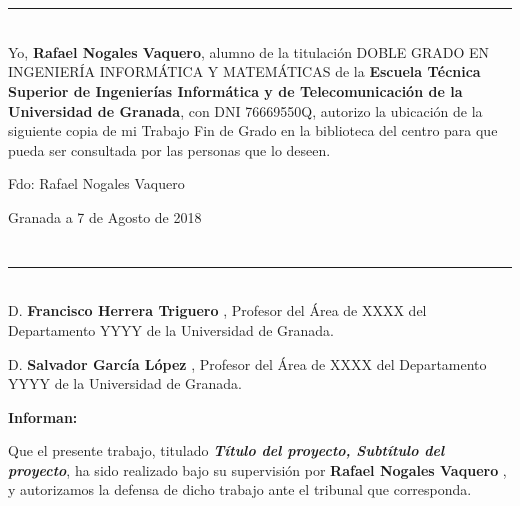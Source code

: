 \chapter*{}
\thispagestyle{empty}

\noindent\rule[-1ex]{\textwidth}{2pt}\\[4.5ex]

Yo, \textbf{Rafael Nogales Vaquero}, alumno de la titulación DOBLE GRADO EN INGENIERÍA INFORMÁTICA Y MATEMÁTICAS de la \textbf{Escuela Técnica Superior
de Ingenierías Informática y de Telecomunicación de la Universidad de Granada}, con DNI 76669550Q, autorizo la
ubicación de la siguiente copia de mi Trabajo Fin de Grado en la biblioteca del centro para que pueda ser
consultada por las personas que lo deseen.

\vspace{6cm}

\noindent Fdo: Rafael Nogales Vaquero

\vspace{2cm}

\begin{flushright}
Granada a 7 de Agosto de 2018
\end{flushright}


\chapter*{}
\thispagestyle{empty}

\noindent\rule[-1ex]{\textwidth}{2pt}\\[4.5ex]

D. \textbf{Francisco Herrera Triguero  }, Profesor del Área de XXXX del Departamento YYYY de la Universidad de Granada.

\vspace{0.5cm}

D. \textbf{Salvador García López }, Profesor del Área de XXXX del Departamento YYYY de la Universidad de Granada.


\vspace{0.5cm}

\textbf{Informan:}

\vspace{0.5cm}

Que el presente trabajo, titulado \textit{\textbf{Título del proyecto, Subtítulo del proyecto}},
ha sido realizado bajo su supervisión por \textbf{Rafael Nogales Vaquero }, y autorizamos la defensa de dicho trabajo ante el tribunal
que corresponda.

\vspace{0.5cm}

